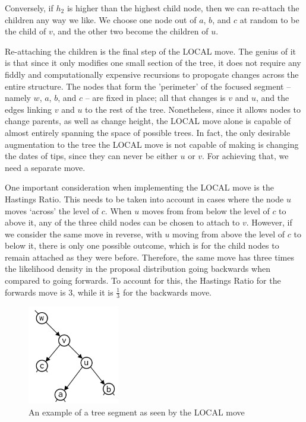 \documentclass[10pt,journal,compsoc]{IEEEtran}
\begin{document}
Conversely, if $h_2$ is higher than the highest child node, then we can re-attach the children any way we like. We choose one node out of $a$, $b$, and $c$ at random to be the child of $v$, and the other two become the children of $u$.

Re-attaching the children is the final step of the LOCAL move. The genius of it is that since it only modifies one small section of the tree, it does not require any fiddly and computationally expensive recursions to propogate changes across the entire structure. The nodes that form the 'perimeter' of the focused segment -- namely $w$, $a$, $b$, and $c$ -- are fixed in place; all that changes is $v$ and $u$, and the edges linking $v$ and $u$ to the rest of the tree. Nonetheless, since it allows nodes to change parents, as well as change height, the LOCAL move alone is capable of almost entirely spanning the space of possible trees. In fact, the only desirable augmentation to the tree the LOCAL move is not capable of making is changing the dates of tips, since they can never be either $u$ or $v$. For achieving that, we need a separate move.

One important consideration when implementing the LOCAL move is the Hastings Ratio. This needs to be taken into account in cases where the node $u$ moves `across' the level of $c$. When $u$ moves from from below the level of $c$ to above it, any of the three child nodes can be chosen to attach to $v$. However, if we consider the same move in reverse, with $u$ moving from above the level of $c$ to below it, there is only one possible outcome, which is for the child nodes to remain attached as they were before. Therefore, the same move has three times the likelihood density in the proposal distribution going backwards when compared to going forwards. To account for this, the Hastings Ratio for the forwards move is $3$, while it is $\frac{1}{3}$ for the backwards move. 
\begin{figure}
\caption{An example of a tree segment as seen by the LOCAL move}\label{fig:local}
\vspace{0.2cm}
\includegraphics[width=4cm,center]{local}
\end{figure}
\end{document}
